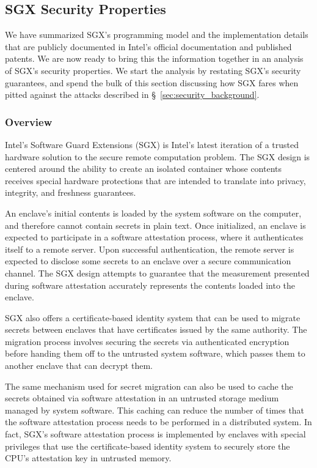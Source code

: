 \subsection{SGX Security Properties}
\label{sec:sgx_security_analysis}

We have summarized SGX's programming model and the implementation details
that are publicly documented in Intel's official documentation and published
patents. We are now ready to bring this the information together in an analysis
of SGX's security properties. We start the analysis by restating SGX's
security guarantees, and spend the bulk of this section discussing how SGX
fares when pitted against the attacks described in
\S~\ref{sec:security_background}.


\subsubsection{Overview}

Intel's Software Guard Extensions (SGX) is Intel's latest iteration of a
trusted hardware solution to the secure remote computation problem. The SGX
design is centered around the ability to create an isolated container whose
contents receives special hardware protections that are intended to translate
into privacy, integrity, and freshness guarantees.


An enclave's initial contents is loaded by the system software on the computer,
and therefore cannot contain secrets in plain text. Once initialized, an
enclave is expected to participate in a software attestation process, where it
authenticates itself to a remote server. Upon successful authentication, the
remote server is expected to disclose some secrets to an enclave over a
secure communication channel. The SGX design attempts to guarantee that the
measurement presented during software attestation accurately represents the
contents loaded into the enclave.

SGX also offers a certificate-based identity system that can be used to migrate
secrets between enclaves that have certificates issued by the same authority.
The migration process involves securing the secrets via authenticated
encryption before handing them off to the untrusted system software, which
passes them to another enclave that can decrypt them.

The same mechanism used for secret migration can also be used to cache the
secrets obtained via software attestation in an untrusted storage medium
managed by system software. This caching can reduce the number of times that
the software attestation process needs to be performed in a distributed system.
In fact, SGX's software attestation process is implemented by enclaves with
special privileges that use the certificate-based identity system to securely
store the CPU's attestation key in untrusted memory.



